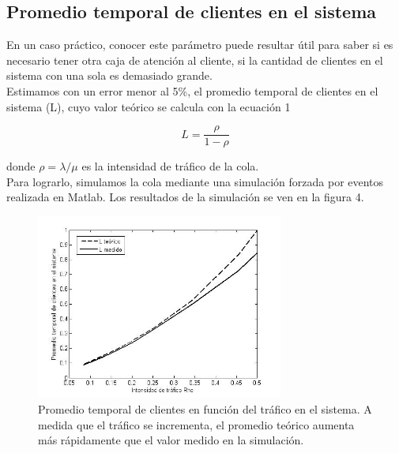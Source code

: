 \documentclass[10pt,journal,compsoc]{IEEEtran}
\begin{document}
\subsection{Promedio temporal de clientes en el sistema} %
En un caso pr\'actico, conocer este par\'ametro puede resultar \'util para saber si es necesario
tener otra caja de atenci\'on al cliente, si la cantidad de clientes en el sistema con una sola es demasiado grande.\\
Estimamos con un error menor al 5\%, el promedio temporal de clientes en el sistema (L), 
cuyo valor te\'orico se calcula con la ecuaci\'on 1

\begin{equation}
L = \frac{\rho}{1-\rho}
\end{equation}

donde $\rho=\lambda/\mu$ es la intensidad de tr\'afico de la cola.\\
Para lograrlo, simulamos la cola mediante una simulaci\'on forzada por eventos realizada en Matlab.
Los resultados de la simulaci\'on se ven en la figura 4.

\begin{figure}[t]%
\label{fig:puntouno}
\begin{center}
\centering
\includegraphics[width=3.2in]{L_rho}
\caption{Promedio temporal de clientes en funci\'on del tr\'afico en el sistema. A medida que el tr\'afico se incrementa, el promedio te\'orico aumenta m\'as r\'apidamente que el valor medido en la simulaci\'on.}
\end{center}
\end{figure}
\end{document}
